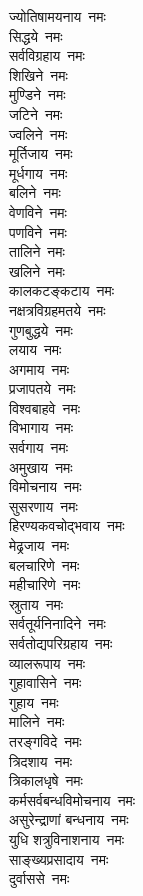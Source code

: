 \begin{multicols}{2}
\begin{flushleft}
ज्योतिषामयनाय~नमः\\
सिद्धये~नमः\\
सर्वविग्रहाय~नमः\\
शिखिने~नमः\\
मुण्डिने~नमः\hfill{}\\
जटिने~नमः\\
ज्वलिने~नमः\\
मूर्तिजाय~नमः\\
मूर्धगाय~नमः\\
बलिने~नमः\\
वेणविने~नमः\\
पणविने~नमः\\
तालिने~नमः\\
खलिने~नमः\\
कालकटङ्कटाय~नमः\hfill{}\\
नक्षत्रविग्रहमतये~नमः\\
गुणबुद्धये~नमः\\
लयाय~नमः\\
अगमाय~नमः\\
प्रजापतये~नमः\\
विश्वबाहवे~नमः\\
विभागाय~नमः\\
सर्वगाय~नमः\\
अमुखाय~नमः\\
विमोचनाय~नमः\hfill{}\\
सुसरणाय~नमः\\
हिरण्यकवचोद्भवाय~नमः\\
मेढ्रजाय~नमः\\
बलचारिणे~नमः\\
महीचारिणे~नमः\\
स्रुताय~नमः\\
सर्वतूर्यनिनादिने~नमः\\
सर्वतोद्यपरिग्रहाय~नमः\\
व्यालरूपाय~नमः\\
गुहावासिने~नमः\hfill{}\\
गुहाय~नमः\\
मालिने~नमः\\
तरङ्गविदे~नमः\\
त्रिदशाय~नमः\\
त्रिकालधृषे~नमः\\
कर्मसर्वबन्धविमोचनाय~नमः\\
असुरेन्द्राणां बन्धनाय~नमः\\
युधि शत्रुविनाशनाय~नमः\\
साङ्ख्यप्रसादाय~नमः\\
दुर्वाससे~नमः\hfill{}\\

\end{flushleft}
\end{multicols}
